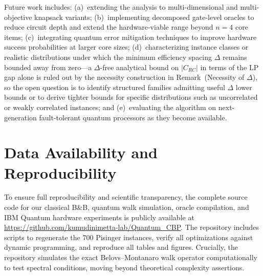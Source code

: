 \documentclass[conference]{IEEEtran} \IEEEoverridecommandlockouts
\begin{document}
Future work includes: (a)~extending the analysis to multi-dimensional and multi-objective knapsack variants; (b)~implementing decomposed gate-level oracles to reduce circuit depth and extend the hardware-viable range beyond $n = 4$ core items; (c)~integrating quantum error mitigation techniques to improve hardware success probabilities at larger core sizes; (d)~characterizing instance classes or realistic distributions under which the minimum efficiency spacing $\Delta$ remains bounded away from zero---a $\Delta$-free analytical bound on $|C_{RC}|$ in terms of the LP gap alone is ruled out by the necessity construction in Remark~(Necessity of $\Delta$), so the open question is to identify structured families admitting useful $\Delta$ lower bounds or to derive tighter bounds for specific distributions such as uncorrelated or weakly correlated instances; and (e)~evaluating the algorithm on next-generation fault-tolerant quantum processors as they become available.




\section{Data Availability and Reproducibility}

To ensure full reproducibility and scientific transparency, the complete source code for our classical B\&B, quantum walk simulation, oracle compilation, and IBM Quantum hardware experiments is publicly available at \url{https://github.com/kumudinimetta-lab/Quantum_CBP}. The repository includes scripts to regenerate the 700 Pisinger instances, verify all optimizations against dynamic programming, and reproduce all tables and figures. Crucially, the repository simulates the exact Belovs--Montanaro walk operator computationally to test spectral conditions, moving beyond theoretical complexity assertions.










 
\end{document}
